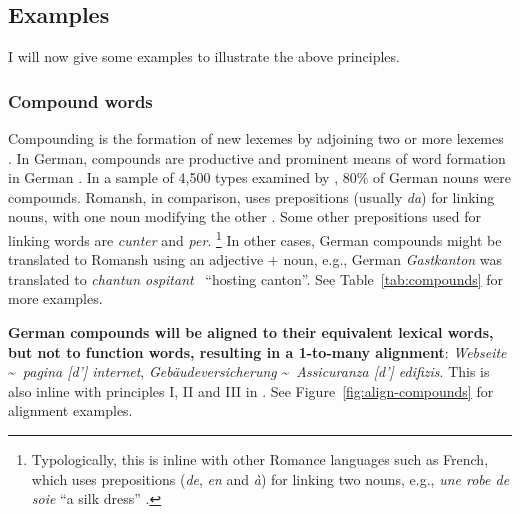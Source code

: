 

\subsection{Examples}\label{sec:gold-standard-examples}
I will now give some examples to illustrate the above principles.
\subsubsection{Compound words}
Compounding is the formation of new lexemes by adjoining two or more lexemes \autocite{bauer1988}. In German, compounds are productive and prominent means of word formation in German \autocite{clematide2018}. 
In a sample of 4,500 types examined by \cite{clematide2018}, 80\% of German nouns were compounds.
Romansh, in comparison, uses prepositions (usually \emph{da}) for linking nouns, with one noun modifying the other \autocite{valladers}. Some other prepositions used for linking words are \emph{cunter} and \emph{per}.
\footnote{Typologically, this is inline with other Romance languages such as French, which uses prepositions (\emph{de}, \emph{en} and \emph{à}) for linking two nouns, e.g., \emph{une robe de soie} \enquote{a silk dress} \autocite[510]{price2008}.}
In other cases, German compounds might be translated to Romansh using an adjective + noun, e.g., German \emph{Gastkanton} was translated to \emph{chantun ospitant} ~\enquote{hosting canton}.
See Table~\ref{tab:compounds} for more examples.

\textbf{German compounds will be aligned to their equivalent lexical words, but not to function words, resulting in a 1-to-many alignment}: \emph{Webseite} \textasciitilde~\emph{pagina [d'] internet}, \emph{Gebäudeversicherung} \textasciitilde~\emph{Assicuranza [d'] edifizis}. 
This is also inline with principles I, II and III in \cite{clematide2018}. 
See Figure~\ref{fig:align-compounds} for alignment examples.

